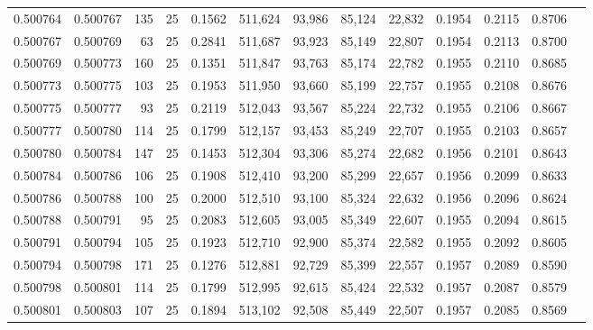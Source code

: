 \begin{tabular}{rrrrrrrrrrrrr}
0.500764 & 0.500767 & 135 &  25 &                                     0.1562 & 511,624 &  93,986 &  85,124 &  22,832 & 0.1954 & 0.2115 & 0.8706 \\
0.500767 & 0.500769 &  63 &  25 &                                     0.2841 & 511,687 &  93,923 &  85,149 &  22,807 & 0.1954 & 0.2113 & 0.8700 \\
0.500769 & 0.500773 & 160 &  25 &                                     0.1351 & 511,847 &  93,763 &  85,174 &  22,782 & 0.1955 & 0.2110 & 0.8685 \\
0.500773 & 0.500775 & 103 &  25 &                                     0.1953 & 511,950 &  93,660 &  85,199 &  22,757 & 0.1955 & 0.2108 & 0.8676 \\
0.500775 & 0.500777 &  93 &  25 &                                     0.2119 & 512,043 &  93,567 &  85,224 &  22,732 & 0.1955 & 0.2106 & 0.8667 \\
0.500777 & 0.500780 & 114 &  25 &                                     0.1799 & 512,157 &  93,453 &  85,249 &  22,707 & 0.1955 & 0.2103 & 0.8657 \\
0.500780 & 0.500784 & 147 &  25 &                                     0.1453 & 512,304 &  93,306 &  85,274 &  22,682 & 0.1956 & 0.2101 & 0.8643 \\
0.500784 & 0.500786 & 106 &  25 &                                     0.1908 & 512,410 &  93,200 &  85,299 &  22,657 & 0.1956 & 0.2099 & 0.8633 \\
0.500786 & 0.500788 & 100 &  25 &                                     0.2000 & 512,510 &  93,100 &  85,324 &  22,632 & 0.1956 & 0.2096 & 0.8624 \\
0.500788 & 0.500791 &  95 &  25 &                                     0.2083 & 512,605 &  93,005 &  85,349 &  22,607 & 0.1955 & 0.2094 & 0.8615 \\
0.500791 & 0.500794 & 105 &  25 &                                     0.1923 & 512,710 &  92,900 &  85,374 &  22,582 & 0.1955 & 0.2092 & 0.8605 \\
0.500794 & 0.500798 & 171 &  25 &                                     0.1276 & 512,881 &  92,729 &  85,399 &  22,557 & 0.1957 & 0.2089 & 0.8590 \\
0.500798 & 0.500801 & 114 &  25 &                                     0.1799 & 512,995 &  92,615 &  85,424 &  22,532 & 0.1957 & 0.2087 & 0.8579 \\
0.500801 & 0.500803 & 107 &  25 &                                     0.1894 & 513,102 &  92,508 &  85,449 &  22,507 & 0.1957 & 0.2085 & 0.8569 \\

\end{tabular}
